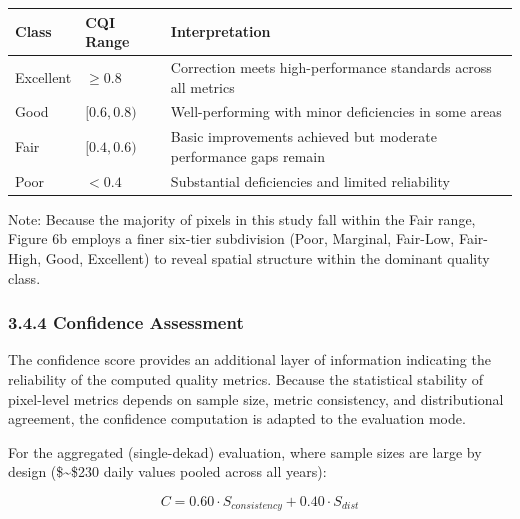 \documentclass[
]{article}
\begin{document}
\begin{longtable}[]{@{}
  >{\centering\arraybackslash}p{}
  >{\centering\arraybackslash}p{}
  >{\raggedright\arraybackslash}p{}@{}}
\toprule\noalign{}
\begin{minipage}[b]{\linewidth}\centering
Class
\end{minipage} & \begin{minipage}[b]{\linewidth}\centering
CQI Range
\end{minipage} & \begin{minipage}[b]{\linewidth}\raggedright
Interpretation
\end{minipage} \\
\midrule\noalign{}
\endhead
\bottomrule\noalign{}
\endlastfoot
Excellent & \(\geq 0.8\) & Correction meets high-performance standards
across all metrics \\
Good & \([0.6, 0.8)\) & Well-performing with minor deficiencies in some
areas \\
Fair & \([0.4, 0.6)\) & Basic improvements achieved but moderate
performance gaps remain \\
Poor & \(< 0.4\) & Substantial deficiencies and limited reliability \\
\end{longtable}

Note: Because the majority of pixels in this study fall within the Fair
range, Figure 6b employs a finer six-tier subdivision (Poor, Marginal,
Fair-Low, Fair-High, Good, Excellent) to reveal spatial structure within
the dominant quality class.

\subsubsection{3.4.4 Confidence Assessment}\label{confidence-assessment}

The confidence score provides an additional layer of information
indicating the reliability of the computed quality metrics. Because the
statistical stability of pixel-level metrics depends on sample size,
metric consistency, and distributional agreement, the confidence
computation is adapted to the evaluation mode.

For the aggregated (single-dekad) evaluation, where sample sizes are
large by design (\$\sim\$230 daily values pooled across all years):

\[C = 0.60 \cdot S_{consistency} + 0.40 \cdot S_{dist}\]
\end{document}
